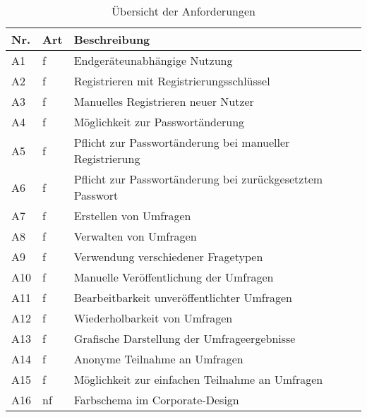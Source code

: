 \begin{table}
  \setlength\extrarowheight{3pt}
\centering
  \begin{tabular}{|C{1cm}|C{1cm}|L{12cm}|}
    \hline
    \textbf{Nr.} & \textbf{Art} & \textbf{Beschreibung} \\
    \hline
    {\label{Anf:A1}A1} & f & Endgeräteunabhängige Nutzung \\
    \hline
    {\label{Anf:A2}A2} & f & Registrieren mit Registrierungsschlüssel \\
    \hline
    {\label{Anf:A3}A3} & f & Manuelles Registrieren neuer Nutzer \\
    \hline
    {\label{Anf:A4}A4} & f & Möglichkeit zur Passwortänderung \\
    \hline
    {\label{Anf:A5}A5} & f & Pflicht zur Passwortänderung bei manueller Registrierung \\
    \hline
    {\label{Anf:A6}A6} & f & Pflicht zur Passwortänderung bei zurückgesetztem Passwort \\
    \hline
    {\label{Anf:A7}A7} & f & Erstellen von Umfragen \\
    \hline
    {\label{Anf:A8}A8} & f & Verwalten von Umfragen \\
    \hline
    {\label{Anf:A9}A9} & f & Verwendung verschiedener Fragetypen \\
    \hline
    {\label{Anf:A10}A10} & f & Manuelle Veröffentlichung der Umfragen \\
    \hline
    {\label{Anf:A11}A11} & f & Bearbeitbarkeit unveröffentlichter Umfragen \\
    \hline
    {\label{Anf:A12}A12} & f & Wiederholbarkeit von Umfragen \\
    \hline
    {\label{Anf:A13}A13} & f & Grafische Darstellung der Umfrageergebnisse \\
    \hline
    {\label{Anf:A14}A14} & f & Anonyme Teilnahme an Umfragen \\
    \hline
    {\label{Anf:A15}A15} & f & Möglichkeit zur einfachen Teilnahme an Umfragen \\
    \hline
    {\label{Anf:A16}A16} & nf & Farbschema im Corporate-Design \\
    \hline
  \end{tabular}
  \caption{Übersicht der Anforderungen}
  \label{tab:Anforderungen}
\end{table}
